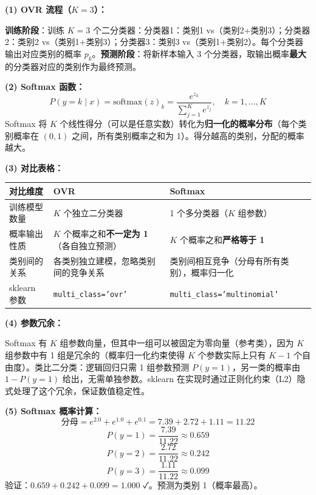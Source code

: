 \documentclass[a4paper,11pt]{ctexart}
\begin{document}
\begin{solutionbox}[参考答案与详细解析]
    \textbf{(1) OVR 流程（$K=3$）：}

    \textbf{训练阶段}：训练 $K=3$ 个二分类器：分类器1：类别1 vs（类别2+类别3）；分类器2：类别2 vs（类别1+类别3）；分类器3：类别3 vs（类别1+类别2）。每个分类器输出对应类别的概率 $p_k$。\textbf{预测阶段}：将新样本输入 3 个分类器，取输出概率\textbf{最大}的分类器对应的类别作为最终预测。

    \textbf{(2) Softmax 函数：}
    \[
    P(y=k\mid x) = \text{softmax}(z)_k = \frac{e^{z_k}}{\sum_{j=1}^K e^{z_j}}, \quad k=1,\ldots,K
    \]
    Softmax 将 $K$ 个线性得分（可以是任意实数）转化为\textbf{归一化的概率分布}（每个类别概率在 $(0,1)$ 之间，所有类别概率之和为 1）。得分越高的类别，分配的概率越大。

    \textbf{(3) 对比表格：}
    \begin{center}
    \begin{tabular}{p{3cm} p{4cm} p{4.5cm}}
        \toprule
        对比维度 & OVR & Softmax \\
        \midrule
        训练模型数量 & $K$ 个独立二分类器 & 1 个多分类器（$K$ 组参数） \\[0.8em]
        概率输出性质 & $K$ 个概率之和\textbf{不一定为 1}（各自独立预测） & $K$ 个概率之和\textbf{严格等于 1} \\[0.8em]
        类别间的关系 & 各类别独立建模，忽略类别间的竞争关系 & 类别间相互竞争（分母有所有类别），概率归一化 \\[0.8em]
        sklearn 参数 & \texttt{multi\_class='ovr'} & \texttt{multi\_class='multinomial'} \\
        \bottomrule
    \end{tabular}
    \end{center}

    \textbf{(4) 参数冗余：}

    Softmax 有 $K$ 组参数向量，但其中一组可以被固定为零向量（参考类），因为 $K$ 组参数中有 1 组是冗余的（概率归一化约束使得 $K$ 个参数实际上只有 $K-1$ 个自由度）。类比二分类：逻辑回归只需 1 组参数预测 $P(y=1)$，另一类的概率由 $1-P(y=1)$ 给出，无需单独参数。sklearn 在实现时通过正则化约束（L2）隐式处理了这个冗余，保证数值稳定性。

    \textbf{(5) Softmax 概率计算：}
    \[
    \text{分母} = e^{2.0}+e^{1.0}+e^{0.1} = 7.39+2.72+1.11 = 11.22
    \]
    \[
    P(y=1) = \frac{7.39}{11.22} \approx \mathbf{0.659}
    \]
    \[
    P(y=2) = \frac{2.72}{11.22} \approx \mathbf{0.242}
    \]
    \[
    P(y=3) = \frac{1.11}{11.22} \approx \mathbf{0.099}
    \]
    验证：$0.659+0.242+0.099=1.000$ ✓。预测为类别 1（概率最高）。
\end{solutionbox}
\end{document}
